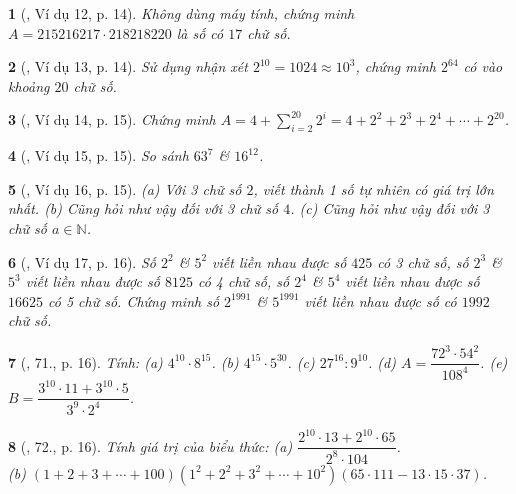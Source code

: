 \documentclass{article}
\newtheorem{baitoan}{}
\begin{document}
\begin{baitoan}[\cite{Binh_Toan_6_tap_1}, Ví dụ 12, p. 14]
	Không dùng máy tính, chứng minh $A = 215216217\cdot218218220$ là số có $17$ chữ số.
\end{baitoan}

\begin{baitoan}[\cite{Binh_Toan_6_tap_1}, Ví dụ 13, p. 14]
	Sử dụng nhận xét $2^{10} = 1024\approx10^3$, chứng minh $2^{64}$ có vào khoảng $20$ chữ số.
\end{baitoan}

\begin{baitoan}[\cite{Binh_Toan_6_tap_1}, Ví dụ 14, p. 15]
	Chứng minh $A = 4 + \sum_{i=2}^{20} 2^i = 4 + 2^2 + 2^3 + 2^4 + \cdots + 2^{20}$.
\end{baitoan}

\begin{baitoan}[\cite{Binh_Toan_6_tap_1}, Ví dụ 15, p. 15]
	So sánh $63^7$ \& $16^{12}$.
\end{baitoan}

\begin{baitoan}[\cite{Binh_Toan_6_tap_1}, Ví dụ 16, p. 15]
	(a) Với 3 chữ số $2$, viết thành 1 số tự nhiên có giá trị lớn nhất. (b) Cũng hỏi như vậy đối với 3 chữ số $4$. (c) Cũng hỏi như vậy đối với 3 chữ số $a\in\mathbb{N}$.
\end{baitoan}

\begin{baitoan}[\cite{Binh_Toan_6_tap_1}, Ví dụ 17, p. 16]
	Số $2^2$ \& $5^2$ viết liền nhau được số $425$ có 3 chữ số, số $2^3$ \& $5^3$ viết liền nhau được số $8125$ có 4 chữ số, số $2^4$ \& $5^4$ viết liền nhau được số $16625$ có 5 chữ số. Chứng minh số $2^{1991}$ \& $5^{1991}$ viết liền nhau được số có $1992$ chữ số.
\end{baitoan}

\begin{baitoan}[\cite{Binh_Toan_6_tap_1}, 71., p. 16]
	Tính: (a) $4^{10}\cdot8^{15}$. (b) $4^{15}\cdot5^{30}$. (c) $27^{16}:9^{10}$. (d) $A = \dfrac{72^3\cdot54^2}{108^4}$. (e) $B = \dfrac{3^{10}\cdot11 + 3^{10}\cdot5}{3^9\cdot2^4}$.
\end{baitoan}

\begin{baitoan}[\cite{Binh_Toan_6_tap_1}, 72., p. 16]
	Tính giá trị của biểu thức: (a) $\dfrac{2^{10}\cdot13 + 2^{10}\cdot65}{2^8\cdot104}$.\\(b) $(1 + 2 + 3 + \cdots + 100)(1^2 + 2^2 + 3^2 + \cdots + 10^2)(65\cdot111 - 13\cdot15\cdot37)$.
\end{baitoan}
\end{document}
